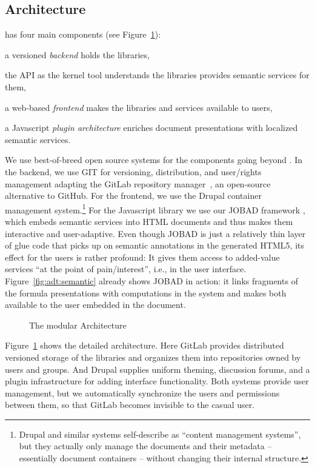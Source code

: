 \subsection{Architecture}\label{sec:mathhub:arch}
\mathhub has four main components (see Figure~\ref{fig:arch}):
\begin{compactenum}[\em i\rm)]
\item a versioned \emph{backend} holds the libraries,
\item the \mmt API as the kernel tool understands the libraries provides semantic services
  for them,
\item a web-based \emph{frontend} makes the libraries and services available to users,
\item a Javascript \emph{plugin architecture} enriches document presentations with
  localized semantic services.
\end{compactenum}
We use best-of-breed open source systems for the components going beyond \mmt.  In the
backend, we use GIT for versioning, distribution, and user/rights management adapting the
GitLab repository manager~\cite{GitLab:on}, an open-source alternative to GitHub. For the
frontend, we use the Drupal container management system.\footnote{Drupal and similar
  systems self-describe as ``content management systems'', but they actually only manage
  the documents and their metadata -- essentially document containers -- without changing
  their internal structure.} For the Javascript library we use our JOBAD framework
\cite{GLR:WebSvcActMathDoc09,Kohlhase:ppte12}, which embeds semantic services into HTML
documents and thus makes them interactive and user-adaptive.  Even though JOBAD is just a
relatively thin layer of glue code that picks up on semantic annotations in the generated
HTML5, its effect for the users is rather profound: It gives them access to added-value
services ``at the point of pain/interest'', i.e., in the user interface.
Figure~\ref{fig:adt:semantic} already shows JOBAD in action: it links fragments of the
formula presentations with computations in the \mmt system and makes both available to the
user embedded in the document.

\begin{figure}[ht]\centering{}
  
  \caption{The modular \mathhub Architecture}\label{fig:arch}
\end{figure}
Figure~\ref{fig:arch} shows the detailed architecture.  Here GitLab provides distributed
versioned storage of the libraries and organizes them into repositories owned by users and
groups.  And Drupal supplies uniform theming, discussion forums, and a plugin
infrastructure for adding interface functionality.  Both systems provide user management,
but we automatically synchronize the users and permissions between them, so that GitLab
becomes invisible to the casual user.

